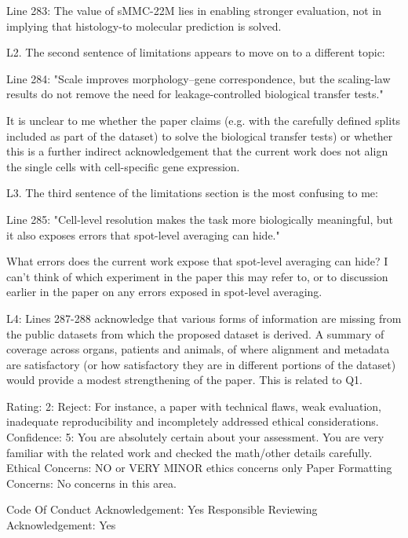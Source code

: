 Line 283: The value of sMMC-22M lies in enabling stronger evaluation, not in implying that histology-to molecular prediction is solved.

L2. The second sentence of limitations appears to move on to a different topic:

Line 284: "Scale improves morphology–gene correspondence, but the scaling-law results do not remove the need for leakage-controlled biological transfer tests."

It is unclear to me whether the paper claims (e.g. with the carefully defined splits included as part of the dataset) to solve the biological transfer tests) or whether this is a further indirect acknowledgement that the current work does not align the single cells with cell-specific gene expression.

L3. The third sentence of the limitations section is the most confusing to me:

Line 285: "Cell-level resolution makes the task more biologically meaningful, but it also exposes errors that spot-level averaging can hide."

What errors does the current work expose that spot-level averaging can hide? I can't think of which experiment in the paper this may refer to, or to discussion earlier in the paper on any errors exposed in spot-level averaging.

L4: Lines 287-288 acknowledge that various forms of information are missing from the public datasets from which the proposed dataset is derived. A summary of coverage across organs, patients and animals, of where alignment and metadata are satisfactory (or how satisfactory they are in different portions of the dataset) would provide a modest strengthening of the paper. This is related to Q1.

Rating: 2: Reject: For instance, a paper with technical flaws, weak evaluation, inadequate reproducibility and incompletely addressed ethical considerations.
Confidence: 5: You are absolutely certain about your assessment. You are very familiar with the related work and checked the math/other details carefully.
Ethical Concerns: NO or VERY MINOR ethics concerns only
Paper Formatting Concerns:
No concerns in this area.

Code Of Conduct Acknowledgement: Yes
Responsible Reviewing Acknowledgement: Yes